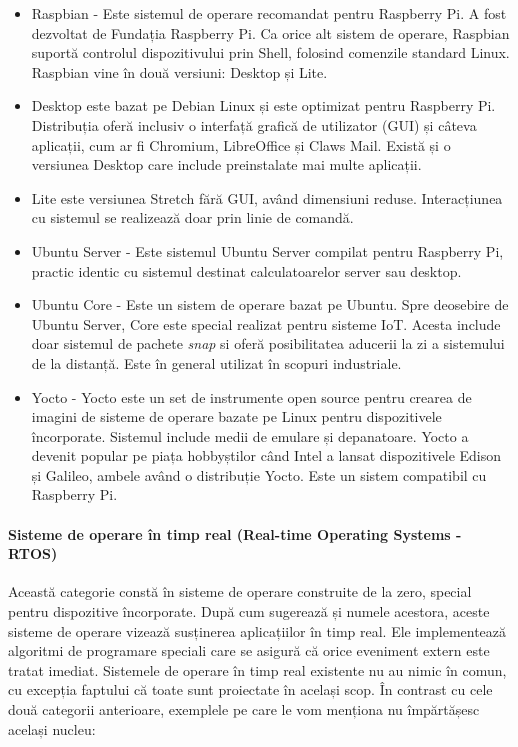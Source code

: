 \begin{itemize}
  \item Raspbian - Este sistemul de operare recomandat pentru Raspberry Pi.
    A fost dezvoltat de Fundația Raspberry Pi.
    Ca orice alt sistem de operare, Raspbian suportă controlul dispozitivului prin Shell, folosind comenzile standard Linux.
    Raspbian vine în două versiuni: Desktop și Lite.
  \item Desktop este bazat pe Debian Linux și este optimizat pentru Raspberry Pi.
    Distribuția oferă inclusiv o interfață grafică de utilizator (GUI) și câteva aplicații, cum ar fi Chromium, LibreOffice și Claws Mail.
    Există și o versiunea Desktop care include preinstalate mai multe aplicații.
  \item Lite este versiunea Stretch fără GUI, având dimensiuni reduse.
    Interacțiunea cu sistemul se realizează doar prin linie de comandă.
  \item Ubuntu Server - Este sistemul Ubuntu Server compilat pentru Raspberry Pi, practic identic cu sistemul destinat calculatoarelor server sau desktop.
  \item Ubuntu Core - Este un sistem de operare bazat pe Ubuntu.
    Spre deosebire de Ubuntu Server, Core este special realizat pentru sisteme IoT.
    Acesta include doar sistemul de pachete \textit{snap} si oferă posibilitatea aducerii la zi a sistemului de la distanță.
    Este în general utilizat în scopuri industriale.
  \item Yocto - Yocto este un set de instrumente open source pentru crearea de imagini de sisteme de operare bazate pe Linux pentru dispozitivele încorporate.
    Sistemul include medii de emulare și depanatoare.
    Yocto a devenit popular pe piața hobbyștilor când Intel a lansat dispozitivele Edison și Galileo, ambele având o distribuție Yocto.
    Este un sistem compatibil cu Raspberry Pi.
\end{itemize}

\paragraph{Sisteme de operare în timp real (Real-time Operating Systems - RTOS)}

Această categorie constă în sisteme de operare construite de la zero, special pentru dispozitive încorporate.
După cum sugerează și numele acestora, aceste sisteme de operare vizează susținerea aplicațiilor în timp real.
Ele implementează algoritmi de programare speciali care se asigură că orice eveniment extern este tratat imediat.
Sistemele de operare în timp real existente nu au nimic în comun, cu excepția faptului că toate sunt proiectate în același scop.
În contrast cu cele două categorii anterioare, exemplele pe care le vom menționa nu împărtășesc același nucleu:

